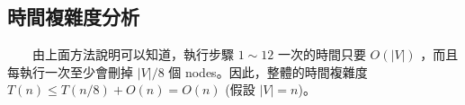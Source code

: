 \documentclass[12pt]{article}
\begin{document}
\begin{CJK}{UTF8}{bkai}
\section{時間複雜度分析}

~~~~由上面方法說明可以知道，執行步驟 $1\sim12$ 一次的時間只要 $O(|V|)$ ，而且每執行一次至少會刪掉 $|V|/8$
個 nodes。因此，整體的時間複雜度 $T(n)\leq T(n/8)+O(n)=O(n)$ (假設 $|V|=n$)。


\end{CJK}
\end{document}
